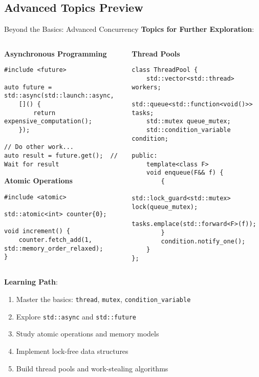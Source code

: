 \subsection{Advanced Topics Preview}
\begin{frame}[fragile]{ Beyond the Basics: Advanced Concurrency}
	\textbf{Topics for Further Exploration}:

	\begin{columns}
		\begin{column}{0.5\textwidth}
			\textbf{Asynchronous Programming}
			\begin{verbatim}
#include <future>

auto future = std::async(std::launch::async,
    []() {
        return expensive_computation();
    });

// Do other work...
auto result = future.get();  // Wait for result
			\end{verbatim}

			\textbf{Atomic Operations}
			\begin{verbatim}
#include <atomic>

std::atomic<int> counter{0};

void increment() {
    counter.fetch_add(1, std::memory_order_relaxed);
}
			\end{verbatim}
		\end{column}
		\begin{column}{0.5\textwidth}
			\textbf{Thread Pools}
			\begin{verbatim}
class ThreadPool {
    std::vector<std::thread> workers;
    std::queue<std::function<void()>> tasks;
    std::mutex queue_mutex;
    std::condition_variable condition;

public:
    template<class F>
    void enqueue(F&& f) {
        {
            std::lock_guard<std::mutex> lock(queue_mutex);
            tasks.emplace(std::forward<F>(f));
        }
        condition.notify_one();
    }
};
			\end{verbatim}
		\end{column}
	\end{columns}

	\vspace{1em}
	\textbf{Learning Path}:
	\begin{enumerate}
		\item Master the basics: \texttt{thread}, \texttt{mutex}, \texttt{condition\_variable}
		\item Explore \texttt{std::async} and \texttt{std::future}
		\item Study atomic operations and memory models
		\item Implement lock-free data structures
		\item Build thread pools and work-stealing algorithms
	\end{enumerate}
\end{frame}
